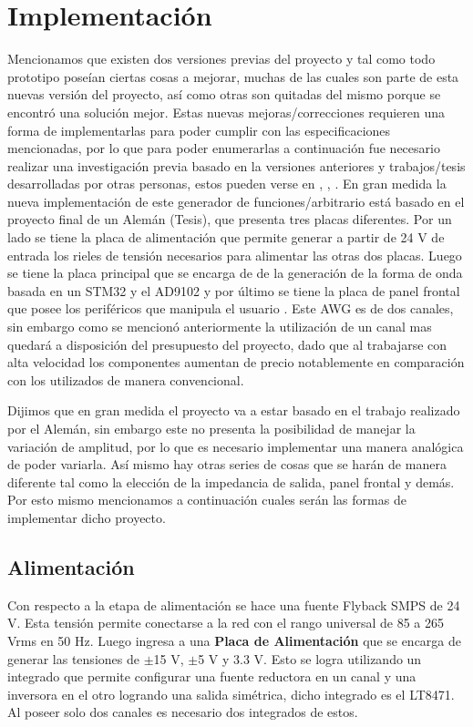 \section{Implementación}
Mencionamos que existen dos versiones previas del proyecto y tal como todo prototipo poseían ciertas cosas a mejorar, muchas de las cuales son parte de esta nuevas versión del proyecto, así como otras son quitadas del mismo porque se encontró una solución mejor. Estas nuevas mejoras/correcciones requieren una forma de implementarlas para poder cumplir con las especificaciones mencionadas, por lo que para poder enumerarlas a continuación fue necesario realizar una investigación previa basado en la versiones anteriores y trabajos/tesis desarrolladas por otras personas, estos pueden verse en \cite{dentgen2019_funktionsgeneratorv2_projektdoku}, \cite{genfunciones2025_rpipico_pdf}, \cite{dds2022_montaje_electronico_completo}. En gran medida la nueva implementación de este generador de funciones/arbitrario está basado en el proyecto final de un Alemán \cite{dentgen2019_funktionsgeneratorv2_projektdoku} (Tesis), que presenta tres placas diferentes. Por un lado se tiene la placa de alimentación \cite{dentgen2019_funktionsgeneratorv2_netzteil_sch} que permite generar a partir de 24 V de entrada los rieles de tensión necesarios para alimentar las otras dos placas. Luego se tiene la placa principal que se encarga de de la generación de la forma de onda basada en un STM32 y el AD9102 \cite{dentgen2019_funktionsgeneratorv2_hauptplatine_sch} y por último se tiene la placa de panel frontal que posee los periféricos que manipula el usuario \cite{dentgen2019_funktionsgeneratorv2_frontpanel_sch}. Este AWG es de dos canales, sin embargo como se mencionó anteriormente la utilización de un canal mas quedará a disposición del presupuesto del proyecto, dado que al trabajarse con alta velocidad los componentes aumentan de precio notablemente en comparación con los utilizados de manera convencional.

Dijimos que en gran medida el proyecto va a estar basado en el trabajo realizado por el Alemán, sin embargo este no presenta la posibilidad de manejar la variación de amplitud, por lo que es necesario implementar una manera analógica de poder variarla. Así mismo hay otras series de cosas que se harán de manera diferente tal como la elección de la impedancia de salida, panel frontal y demás. Por esto mismo mencionamos a continuación cuales serán las formas de implementar dicho proyecto.

\subsection{Alimentación}
Con respecto a la etapa de alimentación se hace una fuente Flyback SMPS de 24 V. Esta tensión permite conectarse a la red con el rango universal de 85 a 265 Vrms en 50 Hz. Luego ingresa a una \textbf{Placa de Alimentación} que se encarga de generar las tensiones de $\pm$15 V, $\pm$5 V y 3.3 V. Esto se logra utilizando un integrado que permite configurar una fuente reductora en un canal y una inversora en el otro logrando una salida simétrica, dicho integrado es el LT8471. Al poseer solo dos canales es necesario dos integrados de estos.

